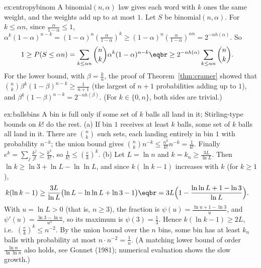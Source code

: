 \begin{solution}{ex:entropybinom}
\idea A binomial$(n,\alpha)$ law gives each word with $k$ ones the same weight, and the weights add up to at most $1$.
\writeup Let $S$ be binomial$(n,\alpha)$. For $k\le\alpha n$, since $\frac\alpha{1-\alpha}\le1$, $\alpha^k(1-\alpha)^{n-k}=(1-\alpha)^n(\frac\alpha{1-\alpha})^k\ge(1-\alpha)^n(\frac\alpha{1-\alpha})^{\alpha n}=2^{-nh(\alpha)}$. So
\[
\begin{aligned}1\ge P(S\le\alpha n)&=\sum_{k\le\alpha n}\binom nk\alpha^k(1-\alpha)^{n-k}\eqbr\ge2^{-nh(\alpha)}\sum_{k\le\alpha n}\binom nk.\end{aligned}
\]
For the lower bound, with $\beta=\frac kn$, the proof of Theorem~\ref{thm:cramer} showed that $\binom nk\beta^k(1-\beta)^{n-k}\ge\frac1{n+1}$ (the largest of
$n+1$ probabilities adding up to $1$), and $\beta^k(1-\beta)^{n-k}=2^{-nh(\beta)}$. (For $k\in\{0,n\}$, both sides are trivial.)
\end{solution}

\begin{solution}{ex:ballsbins}
\idea A bin is full only if some set of $k$ balls all land in it; Stirling-type bounds on $k!$ do the rest.
\writeup (a) If bin $1$ receives at least $k$ balls, some set of $k$ balls all land in it. There are $\binom nk$ such sets, each landing
entirely in bin $1$ with probability $n^{-k}$; the union bound gives $\binom nkn^{-k}\le\frac{n^k}{k!}n^{-k}=\frac1{k!}$. Finally $e^k=\sum_j\frac{k^j}{j!}\ge\frac{k^k}{k!}$, so
$\frac1{k!}\le(\frac ek)^k$.
(b) Let $L=\ln n$ and $k=k_n\ge\frac{3L}{\ln L}$. Then $\ln k\ge\ln3+\ln L-\ln\ln L$, and since $k(\ln k-1)$ increases with $k$ (for $k\ge1$),
\[
\begin{aligned}k(\ln k-1)&\ge\frac{3L}{\ln L}\bigl(\ln L-\ln\ln L+\ln3-1\bigr)\eqbr=3L\Bigl(1-\frac{\ln\ln L+1-\ln3}{\ln L}\Bigr).\end{aligned}
\]
With $u=\ln L>0$ (that is, $n\ge3$), the fraction is $\psi(u)=\frac{\ln u+1-\ln3}u$, and $\psi'(u)=\frac{\ln3-\ln u}{u^2}$, so its maximum is $\psi(3)=\frac13$. Hence
$k(\ln k-1)\ge2L$, i.e.\ $(\frac ek)^k\le n^{-2}$. By the union bound over the $n$ bins, some bin has at least $k_n$ balls with
probability at most $n\cdot n^{-2}=\frac1n$. (A matching lower bound of order $\frac{\ln n}{\ln\ln n}$ also holds, see Gonnet (1981); numerical evaluation shows the slow growth.)
\end{solution}

